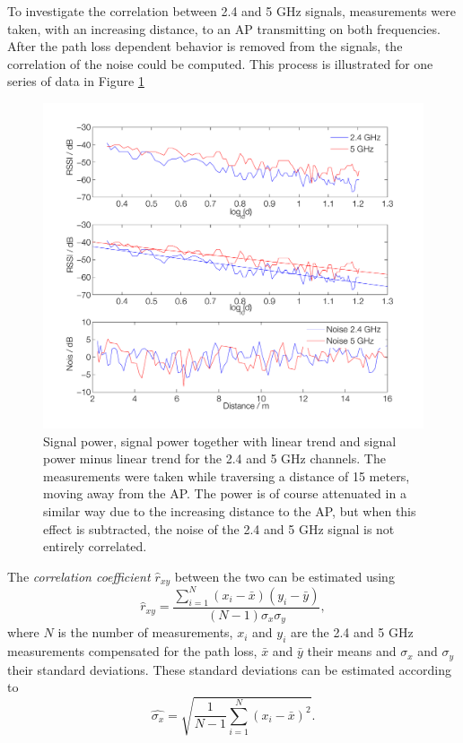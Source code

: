 \documentclass{LTHthesis}
\begin{document}
To investigate the correlation between 2.4 and 5 GHz signals, measurements were taken, with an increasing distance, to an AP transmitting on both frequencies. After the path loss dependent behavior is removed from the signals, the correlation of the noise could be computed. This process is illustrated for one series of data in Figure \ref{noise_corr_los} 
%
\begin{figure}[!hbt]

\includegraphics[width=1\textwidth ]{images/wifi/noise_corr_los}
\caption{Signal power, signal power together with linear trend and signal power minus linear trend for the 2.4 and 5 GHz channels. The measurements were taken while traversing a distance of 15 meters, moving away from the AP. The power is of course attenuated in a similar way due to the increasing distance to the AP, but when this effect is subtracted, the noise of the 2.4 and 5 GHz signal is not entirely correlated.}\label{noise_corr_los}
\end{figure}

The \emph{correlation coefficient $\hat  r_{xy}$} between the two can be estimated using
\begin{equation}
\hat r_{xy}=\frac{\sum\limits_{i=1}^{N}{(x_i-\bar{x})(y_i-\bar{y})}}{(N-1)\sigma_x\sigma_y},
\end{equation}
where $N$ is the number of measurements, $x_i$ and $y_i$ are the 2.4 and 5 GHz measurements compensated for the path loss, $\bar x$ and $\bar y$ their means and $\sigma_x$ and $\sigma_y$ their standard deviations. These standard deviations can be estimated according to 
%
\begin{equation}
\hat{\sigma_x} = \sqrt{\frac{1}{N-1}\sum_{i=1}^N(x_i-\bar x)^2}.
\end{equation}
%  
\end{document}
